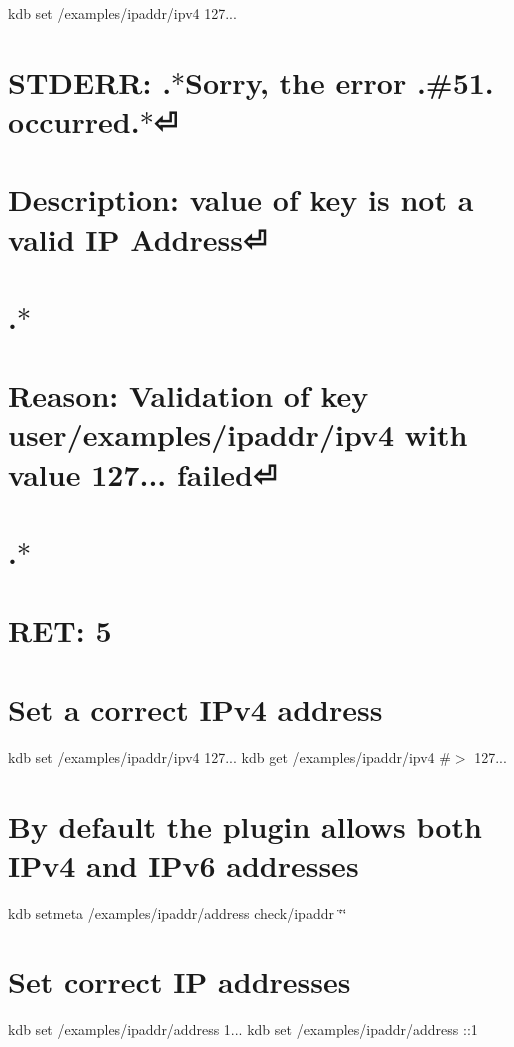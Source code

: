 kdb set /examples/ipaddr/ipv4 127... \section*{S\+T\+D\+E\+RR\+: .$\ast$\+Sorry, the error .\#51. occurred.$\ast$⏎}

\section*{Description\+: value of key is not a valid IP Address⏎}

\section*{.$\ast$}

\section*{Reason\+: Validation of key user/examples/ipaddr/ipv4 with value 127... failed⏎}

\section*{.$\ast$}

\section*{R\+ET\+: 5}

\section*{Set a correct I\+Pv4 address}

kdb set /examples/ipaddr/ipv4 127... kdb get /examples/ipaddr/ipv4 \#$>$ 127...

\section*{By default the plugin allows both I\+Pv4 and I\+Pv6 addresses}

kdb setmeta /examples/ipaddr/address check/ipaddr \char`\"{}\char`\"{}

\section*{Set correct IP addresses}

kdb set /examples/ipaddr/address 1... kdb set /examples/ipaddr/address \+:\+:1

